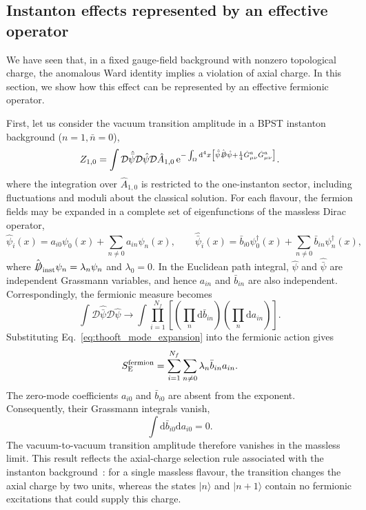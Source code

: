 \documentclass[review]{elsarticle}
\numberwithin{equation}{section}
\numberwithin{table}{section}
\numberwithin{figure}{section}
\def\d{\mathrm{d}}
\def\e{\mathrm{e}}
\begin{document}
\subsection{Instanton effects represented by an effective operator}
\label{sec:thooft_vertex}

We have seen that, in a fixed gauge-field background with nonzero topological charge, the anomalous Ward identity implies a violation of axial charge. In this section, we show how this effect can be represented by an effective fermionic operator.

First, let us consider the vacuum transition amplitude in a BPST instanton background ($n=1,\bar n=0$),
\begin{align}
    Z_{1,0} = \int\mathcal{D}\hat{\bar\psi} \mathcal{D}\hat\psi\mathcal{D}\hat A_{1,0} \,\e^{-\int_\Omega \d^4x\left[\hat{\bar\psi}\hat{\slashed{D}} \hat\psi+\frac{1}{4}\hat G_{\mu\nu}^a\hat G_{\mu\nu}^a\right]}.\label{eq:one_instanton_amplitude}
\end{align}
where the integration over $\hat A_{1,0}$ is restricted to the one-instanton sector, including fluctuations and moduli about the classical solution. For each flavour, the fermion fields may be expanded in a complete set of eigenfunctions of the massless Dirac operator,
\begin{equation}
    \hat\psi_i(x) = a_{i0}\psi_0(x)+\sum_{n\ne0}a_{in}\psi_n(x),\qquad 
    \hat{\bar\psi}_i(x) = \bar b_{i0}\psi_0^\dagger(x)+\sum_{n\ne0}\bar b_{in}\psi_n^\dagger(x), \label{eq:thooft_mode_expansion}
\end{equation}
where $\hat{\slashed{D}}_{\rm inst}\psi_n=\lambda_n\psi_n$ and $\lambda_0=0$. In the Euclidean path integral, $\hat\psi$ and $\hat{\bar\psi}$ are independent Grassmann variables, and hence $a_{in}$ and $\bar b_{in}$ are also independent. Correspondingly, the fermionic measure becomes
\begin{equation}
    \int\mathcal{D}\hat{\bar\psi}\mathcal{D}\hat\psi
    \rightarrow 
    \int\prod_{i=1}^{N_f}\left[\left(\prod_n \d\bar b_{in}\right) \left(\prod_n \d a_{in}\right)\right].\label{eq:thooft_fermion_measure}
\end{equation}
Substituting Eq.~\eqref{eq:thooft_mode_expansion} into the fermionic action gives
\begin{equation}
    S_{{\rm E}}^{\rm fermion} = \sum_{i=1}^{N_f}\sum_{n\ne0}\lambda_n\bar b_{in}a_{in}.
\label{eq:thooft_fermion_action}
\end{equation}
The zero-mode coefficients $a_{i0}$ and $\bar b_{i0}$ are absent from the exponent. Consequently, their Grassmann integrals vanish,
\begin{equation}
    \int\d\bar b_{i0}\d a_{i0}=0.
    \label{eq:thooft_zero_mode_integral}
\end{equation}
The vacuum-to-vacuum transition amplitude therefore vanishes in the massless limit. This result reflects the axial-charge selection rule associated with the instanton background~\cite{tHooft:1976snw,tHooft:1976rip}: for a single massless flavour, the transition changes the axial charge by two units, whereas the states $|n\rangle$ and $|n+1\rangle$ contain no fermionic excitations that could supply this charge.
\end{document}
